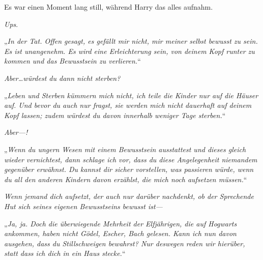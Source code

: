 Es war einen Moment lang still, während Harry das alles aufnahm.

\emph{Ups}.


„\emph{In der Tat. Offen gesagt, es gefällt mir nicht, mir meiner selbst bewusst zu sein. Es ist unangenehm. Es wird eine Erleichterung sein, von deinem Kopf runter zu kommen und das Bewusstsein zu verlieren.}“

\emph{Aber…würdest du dann nicht sterben?}

„\emph{Leben und Sterben kümmern mich nicht, ich teile die Kinder nur auf die Häuser auf. Und bevor du auch nur fragst, sie werden mich nicht dauerhaft auf deinem Kopf lassen; zudem würdest du davon innerhalb weniger Tage sterben.}“

\emph{Aber—!}

„\emph{Wenn du ungern Wesen mit einem Bewusstsein ausstattest und dieses gleich wieder vernichtest, dann schlage ich vor, dass du diese Angelegenheit niemandem gegenüber erwähnst. Du kannst dir sicher vorstellen, was passieren würde, wenn du all den anderen Kindern davon erzählst, die mich noch aufsetzen müssen.}“

\emph{Wenn jemand dich aufsetzt, der auch nur darüber \emph{nachdenkt}, ob der Sprechende Hut sich seines eigenen Bewusstseins bewusst ist—}

„\emph{Ja, ja. Doch die überwiegende Mehrheit der Elfjährigen, die auf Hogwarts ankommen, haben nicht \emph{Gödel, Escher, Bach} gelesen. Kann ich nun davon ausgehen, dass du Stillschweigen bewahrst? Nur \emph{deswegen} reden wir hierüber, statt dass ich dich in ein Haus stecke.}“

